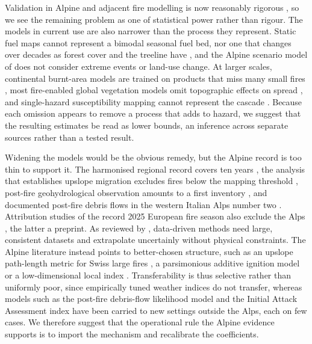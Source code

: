 \documentclass[11pt,a4paper]{article}
\begin{document}
Validation in Alpine and adjacent fire modelling is now reasonably rigorous \citep{trucchia_defining_2022, moreno_spacetime_2025, muller_towards_2020}, so we see the remaining problem as one of statistical power rather than rigour. The models in current use are also narrower than the process they represent. Static fuel maps cannot represent a bimodal seasonal fuel bed, nor one that changes over decades as forest cover and the treeline have \citep{bebi_changes_2017, frei_evidence_2023}, and the Alpine scenario model of \citet{gerberding_mapping_2025} does not consider extreme events or land-use change. At larger scales, continental burnt-area models are trained on products that miss many small fires \citep{forrest_understanding_2024}, most fire-enabled global vegetation models omit topographic effects on spread \citep{jones_global_2022}, and single-hazard susceptibility mapping cannot represent the cascade \citep{trucchia_defining_2022}. Because each omission appears to remove a process that adds to hazard, we suggest that the resulting estimates be read as lower bounds, an inference across separate sources rather than a tested result.

Widening the models would be the obvious remedy, but the Alpine record is too thin to support it. The harmonised regional record covers ten years \citep{conedera_characterizing_2018}, the analysis that establishes upslope migration excludes fires below the mapping threshold \citep{beloiu_climatedriven_2026}, post-fire geohydrological observation amounts to a first inventory \citep{melzner_wildfire-induced_2025}, and documented post-fire debris flows in the western Italian Alps number two \citep{tiranti_wildfires_2021}. Attribution studies of the record 2025 European fire season also exclude the Alps \citep{keeping_attribution_2026, burton_state_2026}, the latter a preprint. As reviewed by \citet{jain_review_2020}, data-driven methods need large, consistent datasets and extrapolate uncertainly without physical constraints. The Alpine literature instead points to better-chosen structure, such as an upslope path-length metric for Swiss large fires \citep{conedera_linking_2024}, a parsimonious additive ignition model \citep{moreno_spacetime_2025} or a low-dimensional local index \citep{de_angelis_modelling_2015}. Transferability is thus selective rather than uniformly poor, since empirically tuned weather indices do not transfer, whereas models such as the post-fire debris-flow likelihood model \citep{diakakis_exploring_2023} and the Initial Attack Assessment index \citep{cardil_assessing_2025} have been carried to new settings outside the Alps, each on few cases. We therefore suggest that the operational rule the Alpine evidence supports is to import the mechanism and recalibrate the coefficients.
\end{document}
